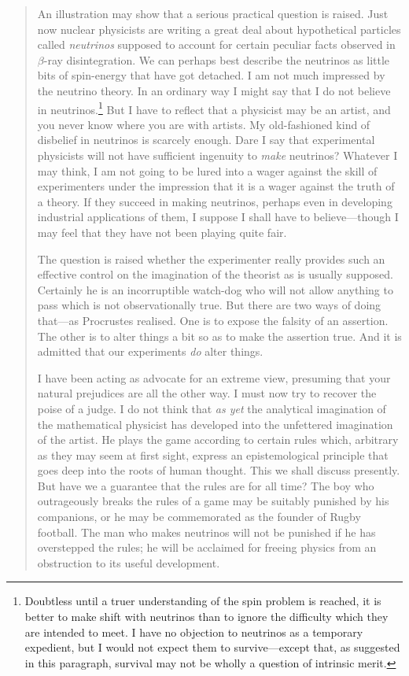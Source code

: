 \begin{quote}
    An illustration may show that a serious practical question is raised.  Just now nuclear physicists are writing a great deal about hypothetical particles called \emph{neutrinos} supposed to account for certain peculiar facts observed in $\beta$-ray disintegration.  We can perhaps best describe the neutrinos as little bits of spin-energy that have got detached.  I am not much impressed by the neutrino theory.  In an ordinary way I might say that I do not believe in neutrinos.\footnote{Doubtless until a truer understanding of the spin problem is reached, it is better to make shift with neutrinos than to ignore the difficulty which they are intended to meet.  I have no objection to neutrinos as a temporary expedient, but I would not expect them to survive---except that, as suggested in this paragraph, survival may not be wholly a question of intrinsic merit.}  But I have to reflect that a physicist may be an artist, and you never know where you are with artists.  My old-fashioned kind of disbelief in neutrinos is scarcely enough.  Dare I say that experimental physicists will not have sufficient ingenuity to \emph{make} neutrinos?  Whatever I may think, I am not going to be lured into a wager against the skill of experimenters under the impression that it is a wager against the truth of a theory.  If they succeed in making neutrinos, perhaps even in developing industrial applications of them, I suppose I shall have to believe---though I may feel that they have not been playing quite fair.  

    The question is raised whether the experimenter really provides such an effective control on the imagination of the theorist as is usually supposed.  Certainly he is an incorruptible watch-dog who will not allow anything to pass which is not observationally true.  But there are two ways of doing that---as Procrustes realised.  One is to expose the falsity of an assertion.  The other is to alter things a bit so as to make the assertion true.  And it is admitted that our experiments \emph{do} alter things.  

    I have been acting as advocate for an extreme view, presuming that your natural prejudices are all the other way.  I must now try to recover the poise of a judge.  I do not think that \emph{as yet} the analytical imagination of the mathematical physicist has developed into the unfettered imagination of the artist.  He plays the game according to certain rules which, arbitrary as they may seem at first sight, express an epistemological principle that goes deep into the roots of human thought.  This we shall discuss presently.  But have we a guarantee that the rules are for all time?  The boy who outrageously breaks the rules of a game may be suitably punished by his companions, or he may be commemorated as the founder of Rugby football.  The man who makes neutrinos will not be punished if he has overstepped the rules; he will be acclaimed for freeing physics from an obstruction to its useful development.

    \citep[p. 109-113]{Eddington1939}
\end{quote}


